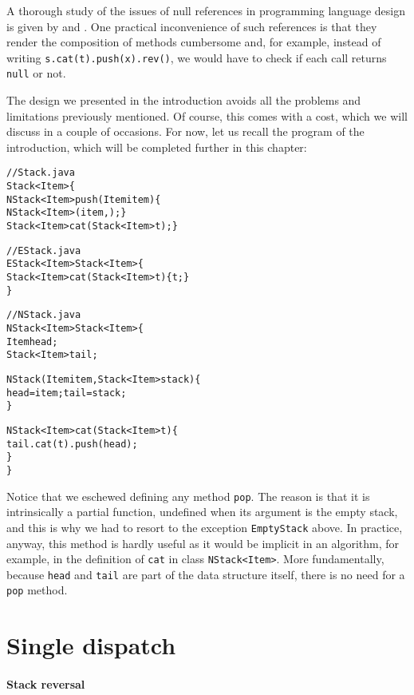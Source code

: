 A thorough study of the issues of null references in programming
language design is given by \cite{ChalinJames_2007,Cobbe_2008} and
\cite{Hoare_2009}. One practical inconvenience of such references is
that they render the composition of methods cumbersome and, for
example, instead of writing \texttt{s.cat(t).push(x).rev()}, we would
have to check if each call returns \texttt{null} or not.

The design we presented in the introduction avoids all the problems
and limitations previously mentioned. Of course, this comes with a
cost, which we will discuss in a couple of occasions. For now, let us
recall the \Java program of the introduction, which will be completed
further in this chapter:
\begin{alltt}
// Stack.java
\public \abstractX \class Stack<Item> \{
  \public \final NStack<Item> push(\final Item item) \{
    \return \new NStack<Item>(item,\this); \}
  \public \abstractX Stack<Item> cat(\final Stack<Item> t); \}

// EStack.java
\public \final \class EStack<Item> \extends Stack<Item> \{
  \public Stack<Item> cat(\final Stack<Item> t) \{ \return t; \}
\}

// NStack.java
\public \final \class NStack<Item> \extends Stack<Item> \{
  \private \final Item head;
  \private \final Stack<Item> tail;

  \public NStack(\final Item item, \final Stack<Item> stack) \{
    head = item; tail = stack;
  \}

  \public NStack<Item> cat(\final Stack<Item> t) \{
    \return tail.cat(t).push(head);
  \}
\}
\end{alltt}
Notice that we eschewed defining any method \texttt{pop}. The reason
is that it is intrinsically a partial function, undefined when its
argument is the empty stack, and this is why we had to resort to the
exception \texttt{EmptyStack} above. In practice, anyway, this method
is hardly useful as it would be implicit in an algorithm, for example,
in the definition of \texttt{cat} in class \texttt{NStack<Item>}. More
fundamentally, because \texttt{head} and \texttt{tail} are part of the
data structure itself, there is no need for a \texttt{pop} method.

\section{Single dispatch}
\label{sec:single_dispatch}

\paragraph{Stack reversal}

